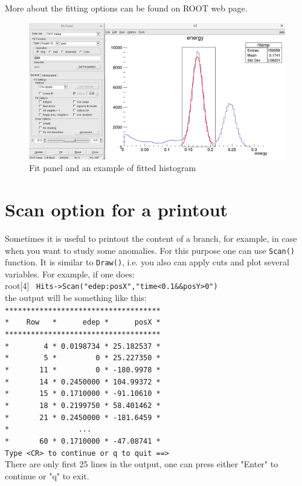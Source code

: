 \documentclass[12pt]{article}
\begin{document}
More about the fitting options can be found on ROOT web page.

\begin{figure}[h]
\centering
\includegraphics[scale=0.35]{figs/FitPanel.png}
\caption{Fit panel and an example of fitted histogram}
\label{fig:FitPanel}
\end{figure}


\section{Scan option for a printout}
Sometimes it is useful to printout the content of a branch, for example, in case when you want to study some anomalies. For this purpose one can use \verb|Scan()| function. It is similar to \verb|Draw()|, i.e. you also can apply cuts and plot several variables. For example, if one does: \\
root[4] \verb| Hits->Scan("edep:posX","time<0.1&&posY>0") |\\
the output will be something like this:\\
\verb|************************************|\\
\verb|*    Row   *      edep *      posX *|\\
\verb|************************************|\\
\verb|*        4 * 0.0198734 * 25.182537 *|\\
\verb|*        5 *         0 * 25.227350 *|\\
\verb|*       11 *         0 * -180.9978 *|\\
\verb|*       14 * 0.2450000 * 104.99372 *|\\
\verb|*       15 * 0.1710000 * -91.10610 *|\\
\verb|*       18 * 0.2199750 * 58.401462 *|\\
\verb|*       21 * 0.2450000 * -181.6459 *|\\
\verb|*                ...                |\\
\verb|*       60 * 0.1710000 * -47.08741 *|\\
\verb|Type <CR> to continue or q to quit ==>|\\
There are only first 25 lines in the output, one can press either "Enter" to continue or "q" to exit.
\end{document}
